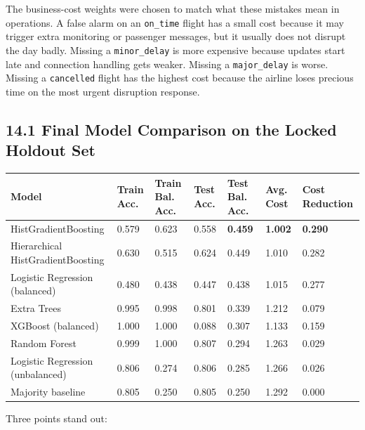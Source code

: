 \documentclass{article}
\newcommand{\code}[1]{\texttt{\small #1}}
\begin{document}
The business-cost weights were chosen to match what these mistakes mean in operations. A false alarm on an \code{on\_time} flight has a small cost because it may trigger extra monitoring or passenger messages, but it usually does not disrupt the day badly. Missing a \code{minor\_delay} is more expensive because updates start late and connection handling gets weaker. Missing a \code{major\_delay} is worse. Missing a \code{cancelled} flight has the highest cost because the airline loses precious time on the most urgent disruption response.


\subsection*{\textcolor{accentgold}{14.1 Final Model Comparison on the Locked Holdout Set}}

\renewcommand{\arraystretch}{1.3}
\small
\begin{longtable}{L{3.9cm} C{1.2cm} C{1.35cm} C{1.2cm} C{1.35cm} C{1.55cm} C{1.65cm}}
    \toprule
    \textbf{Model} & \textbf{Train Acc.} & \textbf{Train Bal. Acc.} & \textbf{Test Acc.} & \textbf{Test Bal. Acc.} & \textbf{Avg. Cost} & \textbf{Cost Reduction} \\
    \midrule
    \endhead
    HistGradientBoosting & 0.579 & 0.623 & 0.558 & \textbf{0.459} & \textbf{1.002} & \textbf{0.290} \\
    Hierarchical HistGradientBoosting & 0.630 & 0.515 & 0.624 & 0.449 & 1.010 & 0.282 \\
    Logistic Regression (balanced) & 0.480 & 0.438 & 0.447 & 0.438 & 1.015 & 0.277 \\
    Extra Trees & 0.995 & 0.998 & 0.801 & 0.339 & 1.212 & 0.079 \\
    XGBoost (balanced) & 1.000 & 1.000 & 0.088 & 0.307 & 1.133 & 0.159 \\
    Random Forest & 0.999 & 1.000 & 0.807 & 0.294 & 1.263 & 0.029 \\
    Logistic Regression (unbalanced) & 0.806 & 0.274 & 0.806 & 0.285 & 1.266 & 0.026 \\
    Majority baseline & 0.805 & 0.250 & 0.805 & 0.250 & 1.292 & 0.000 \\
    \bottomrule
\end{longtable}
\normalsize


Three points stand out:
\end{document}
